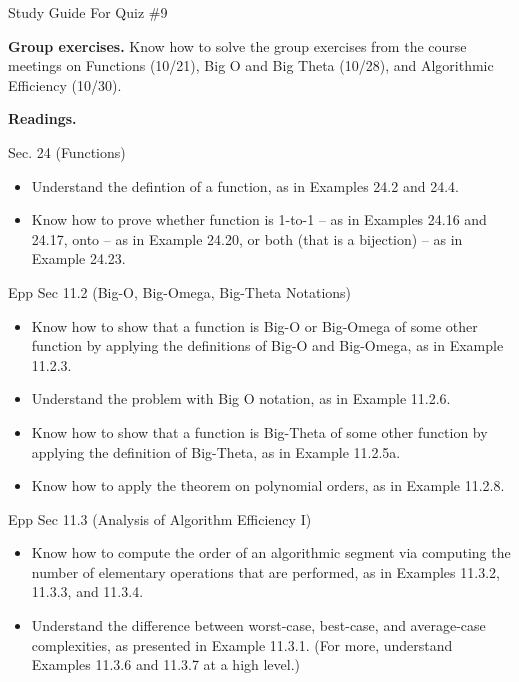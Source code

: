 \documentclass[10pt]{beamer}
\begin{document}
\begin{frame}{Study Guide For Quiz \#9}
\scriptsize 

\colorbox{yellow!20}{\textbf{Group exercises.}} Know how to solve the group exercises from the course meetings on Functions (10/21), Big O and Big Theta (10/28), and Algorithmic Efficiency (10/30).

\vfill 

\colorbox{red!20}{\textbf{Readings.}}   

Sec. 24 (Functions)
\vspace{-.2cm}
\begin{itemize}
\item Understand the defintion of a function, as in Examples 24.2 and 24.4.
\item Know how to prove whether function is 1-to-1 --  as in Examples 24.16 and 24.17, onto -- as in Example 24.20, or both (that is a bijection) -- as in Example 24.23.
\end{itemize}

Epp Sec 11.2 (Big-O, Big-Omega, Big-Theta Notations)
\vspace{-.2cm}
\begin{itemize}
	\item Know how to show that a function is Big-O or Big-Omega of some other function by applying the definitions of Big-O and Big-Omega, as in Example 11.2.3. 
	\item Understand the problem with Big O notation, as in Example 11.2.6.
	\item Know how to show that a function is Big-Theta of some other function by applying the definition of Big-Theta, as in Example 11.2.5a. 
	\item Know how to apply the theorem on polynomial orders, as in Example 11.2.8.
\end{itemize}

Epp Sec 11.3 (Analysis of Algorithm Efficiency I)
\vspace{-.2cm}
\begin{itemize}
\item Know how to compute the order of an algorithmic segment via computing the number of elementary operations that are performed, as in Examples 11.3.2, 11.3.3, and 11.3.4.
\item Understand the difference between worst-case, best-case, and average-case complexities, as presented in Example 11.3.1.  (For more, understand Examples 11.3.6 and 11.3.7 at a high level.)
\end{itemize}

\end{frame}
\end{document}
